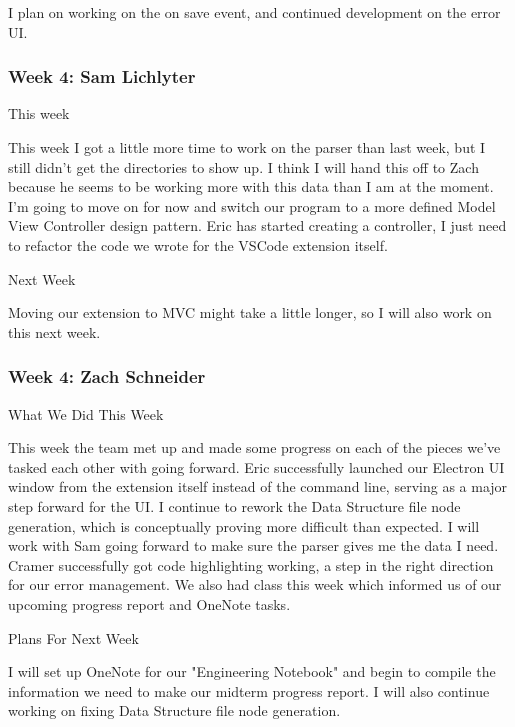 I plan on working on the on save event, and continued development on the error UI. \\ 

 \subsubsection{Week 4: Sam Lichlyter}

This week

This week I got a little more time to work on the parser than last week, but I still didn't get the directories to show up. I think I will hand this off to Zach because he seems to be working more with this data than I am at the moment. I'm going to move on for now and switch our program to a more defined Model View Controller design pattern. Eric has started creating a controller, I just need to refactor the code we wrote for the VSCode extension itself. 



Next Week

Moving our extension to MVC might take a little longer, so I will also work on this next week.  \\ 

 \subsubsection{Week 4: Zach Schneider}

What We Did This Week

This week the team met up and made some progress on each of the pieces we've tasked each other with going forward. Eric successfully launched our Electron UI window from the extension itself instead of the command line, serving as a major step forward for the UI. I continue to rework the Data Structure file node generation, which is conceptually proving more difficult than expected. I will work with Sam going forward to make sure the parser gives me the data I need. Cramer successfully got code highlighting working, a step in the right direction for our error management. We also had class this week which informed us of our upcoming progress report and OneNote tasks.



Plans For Next Week

I will set up OneNote for our "Engineering Notebook" and begin to compile the information we need to make our midterm progress report. I will also continue working on fixing Data Structure file node generation. \\ 


